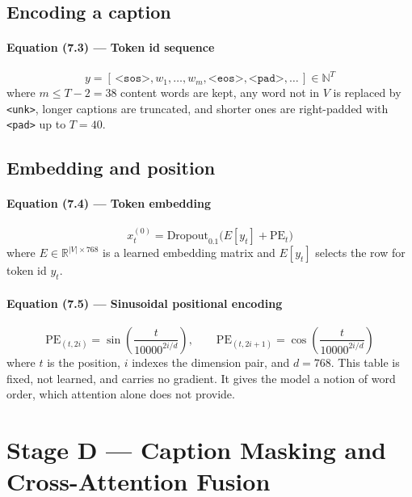 \documentclass[12pt]{article}
\newcommand{\code}[1]{\texttt{#1}}
\begin{document}
\subsection{Encoding a caption}

\paragraph{Equation (7.3) --- Token id sequence}
\begin{equation}
y = [\, \texttt{<sos>}, w_1, \ldots, w_m, \texttt{<eos>}, \texttt{<pad>}, \ldots \,] \in \mathbb{N}^T
\end{equation}
where $m \le T-2 = 38$ content words are kept, any word not in $V$ is replaced by \code{<unk>}, longer captions are truncated, and shorter ones are right-padded with \code{<pad>} up to $T=40$.

\subsection{Embedding and position}

\paragraph{Equation (7.4) --- Token embedding}
\begin{equation}
x_t^{(0)} = \mathrm{Dropout}_{0.1}\bigl(E[y_t] + \mathrm{PE}_t\bigr)
\end{equation}
where $E \in \mathbb{R}^{|V|\times768}$ is a learned embedding matrix and $E[y_t]$ selects the row for token id $y_t$.

\paragraph{Equation (7.5) --- Sinusoidal positional encoding}
\begin{equation}
\mathrm{PE}_{(t,2i)} = \sin\!\left(\frac{t}{10000^{2i/d}}\right), \qquad
\mathrm{PE}_{(t,2i+1)} = \cos\!\left(\frac{t}{10000^{2i/d}}\right)
\end{equation}
where $t$ is the position, $i$ indexes the dimension pair, and $d=768$. This table is fixed, not learned, and carries no gradient. It gives the model a notion of word order, which attention alone does not provide.

\section{Stage D --- Caption Masking and Cross-Attention Fusion}
\label{sec:staged}
\end{document}
